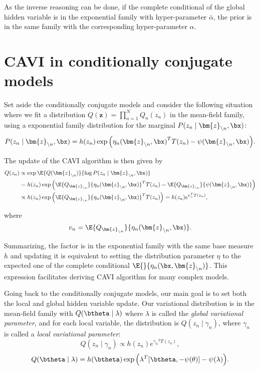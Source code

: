 As the inverse reasoning can be done, if the complete conditional of the global hidden variable is in the exponential family with hyper-parameter \(\bar{\alpha}\), the prior is in the same family with the corresponding hyper-parameter \(\alpha\).

\section{CAVI in conditionally conjugate models} \label{sec:cavi_ccm}

Set aside the conditionally conjugate models and consider the following situation where we fit a distribution \(Q(\bm{z}) = \prod_{n=1}^{N} Q_{n}(z_{n})\) in the mean-field family, using a exponential family distribution for the marginal \(P(z_{n} \mid \bm{z}_{\backslash n}, \bx)\):
\[
  P(z_{n} \mid \bm{z}_{\backslash n}, \bx) = h(z_{n})\exp \Big( {\eta_{n}(\bm{z}_{\backslash n}, \bx)}^{T}T(z_{n}) - \psi(\bm{z}_{\backslash n}, \bx) \Big).
\]

The update of the CAVI algorithm  is then given by
  \begin{align}
    Q(z_{n}) &\propto \exp{\E{Q(\bm{z}_{\backslash n})}{\log P(z_{n} \mid \bm{z}_{\backslash n}, \bx)}} \nonumber\\
    &= h(z_{n})\exp \Big(\E{Q_{\bm{z}_{\backslash n}}}{ {\eta_{n}(\bm{z}_{\backslash n}, \bx)}}^{T}T(z_{n}) - \E{Q_{\bm{z}_{\backslash n}}}{ \psi(\bm{z}_{\backslash n}, \bx)}\Big) \nonumber \\
    &\propto  h(z_{n})\exp \Big(\E{Q_{\bm{z}_{\backslash n}}}{ {\eta_{n}(\bm{z}_{\backslash n}, \bx)}}^{T}T(z_{n})\Big) = h(z_{n})e^{v_{n}^{T}T(z_{n}) }, \label{eq:exponential_update}
  \end{align}

where
\[
  v_{n} = \E{Q_{\bm{z}_{\backslash n}}}{\eta_{n}(\bm{z}_{\backslash n}, \bx)}.
\]

Summarizing, the factor is in the exponential family with the same base measure \(h\) and updating it is equivalent to setting the distribution parameter \(\eta\) to the expected one of the complete conditional \(\E{}{\eta_{n}(\bx, \bm{z}_{\backslash n})}\). This expression facilitates deriving CAVI algorithm for many complex models.

Going back to the conditionally conjugate models, our main goal is to set both the local and global hidden variable update. Our variational distribution is in the mean-field family with \(Q(\btheta \mid \lambda)\) where \(\lambda\) is called the \emph{global variational parameter}, and for each local variable, the distribution is \(Q(z_{n} \mid \gamma_{n})\), where \(\gamma_{n}\) is called a \emph{local variational parameter}:
\[
  Q(z_{n} \mid \gamma_{n}) \propto h(z_{n})e^{{\gamma_{n}}^{T}T(z_{n})},
\]
\[
  Q(\btheta \mid \lambda) = h(\btheta) \exp \Big( {\lambda}^{T}[\btheta, -\psi(\theta)] - \psi(\lambda) \Big).
\]

